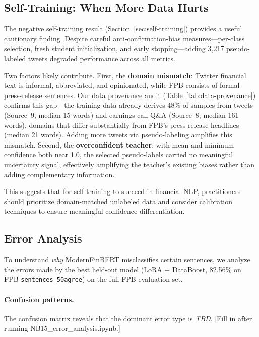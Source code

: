 \documentclass[11pt]{article}
\begin{document}
\subsection{Self-Training: When More Data Hurts}

The negative self-training result (Section~\ref{sec:self-training}) provides a useful cautionary finding. Despite careful anti-confirmation-bias measures---per-class selection, fresh student initialization, and early stopping---adding 3,217 pseudo-labeled tweets degraded performance across all metrics.

Two factors likely contribute. First, the \textbf{domain mismatch}: Twitter financial text is informal, abbreviated, and opinionated, while FPB consists of formal press-release sentences. Our data provenance audit (Table~\ref{tab:data-provenance}) confirms this gap---the training data already derives 48\% of samples from tweets (Source~9, median 15 words) and earnings call Q\&A (Source~8, median 161 words), domains that differ substantially from FPB's press-release headlines (median 21 words). Adding more tweets via pseudo-labeling amplifies this mismatch. Second, the \textbf{overconfident teacher}: with mean and minimum confidence both near 1.0, the selected pseudo-labels carried no meaningful uncertainty signal, effectively amplifying the teacher's existing biases rather than adding complementary information.

This suggests that for self-training to succeed in financial NLP, practitioners should prioritize domain-matched unlabeled data and consider calibration techniques to ensure meaningful confidence differentiation.

\subsection{Error Analysis}
\label{sec:error-analysis}

To understand \emph{why} ModernFinBERT misclassifies certain sentences, we analyze the errors made by the best held-out model (LoRA + DataBoost, 82.56\% on FPB \texttt{sentences\_50agree}) on the full FPB evaluation set.

\paragraph{Confusion patterns.}
The confusion matrix reveals that the dominant error type is \textit{TBD}. [Fill in after running NB15\_error\_analysis.ipynb.]
\end{document}
